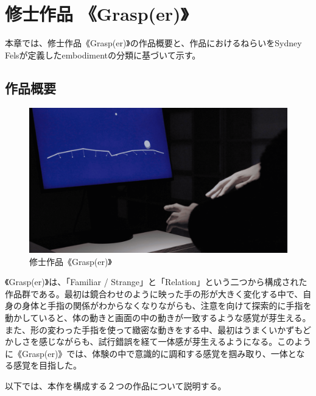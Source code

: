 \chapter{修士作品 《Grasp(er)》}
\label{about_grasper}
本章では、修士作品《Grasp(er)》の作品概要と、作品におけるねらいをSydney Felsが定義したembodimentの分類に基づいて示す。

\section{作品概要}
\begin{figure}[H]
  \centering
  \includegraphics[width=15cm]{img/thumbnail.png}
  \caption{修士作品《Grasp(er)》}
  \label{grasper}
\end{figure}

《Grasp(er)》は、「Familiar / Strange」と「Relation」という二つから構成された作品群である。最初は鏡合わせのように映った手の形が大きく変化する中で、自身の身体と手指の関係がわからなくなりながらも、注意を向けて探索的に手指を動かしていると、体の動きと画面の中の動きが一致するような感覚が芽生える。また、形の変わった手指を使って緻密な動きをする中、最初はうまくいかずもどかしさを感じながらも、試行錯誤を経て一体感が芽生えるようになる。このように《Grasp(er)》では、体験の中で意識的に調和する感覚を掴み取り、一体となる感覚を目指した。

以下では、本作を構成する２つの作品について説明する。



